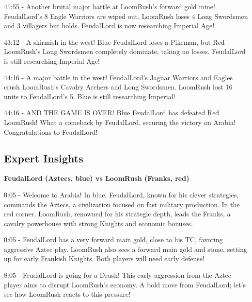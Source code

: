 41:55 - Another brutal major battle at LoomRush's forward gold mine! FeudalLord's 8 Eagle Warriors are wiped out. LoomRush loses 4 Long Swordsmen and 3 villagers but holds. FeudalLord is now researching Imperial Age! \par \vspace{1em}

43:12 - A skirmish in the west! Blue FeudalLord loses a Pikeman, but Red LoomRush's Long Swordsmen completely dominate, taking no losses. FeudalLord is still researching Imperial Age! \par \vspace{1em}

44:16 - A major battle in the west! FeudalLord's Jaguar Warriors and Eagles crush LoomRush's Cavalry Archers and Long Swordsmen. LoomRush lost 16 units to FeudalLord's 5. Blue is still researching Imperial! \par \vspace{1em}

44:16 - AND THE GAME IS OVER! Blue FeudalLord has defeated Red LoomRush! What a comeback by FeudalLord, securing the victory on Arabia! Congratulations to FeudalLord! \par \vspace{1em}

\subsection{Expert Insights}
\textbf{FeudalLord (Aztecs, blue) vs LoomRush (Franks, red)}

0:05 - Welcome to Arabia! In blue, FeudalLord, known for his clever strategies, commands the Aztecs, a civilization focused on fast military production. In the red corner, LoomRush, renowned for his strategic depth, leads the Franks, a cavalry powerhouse with strong Knights and economic bonuses. \par \vspace{1em}

0:05 - FeudalLord has a very forward main gold, close to his TC, favoring aggressive Aztec play. LoomRush also sees a forward main gold and stone, setting up for early Frankish Knights. Both players will need early defense! \par \vspace{1em}

8:05 - FeudalLord is going for a Drush! This early aggression from the Aztec player aims to disrupt LoomRush's economy. A bold move from FeudalLord; let's see how LoomRush reacts to this pressure! \par \vspace{1em}

